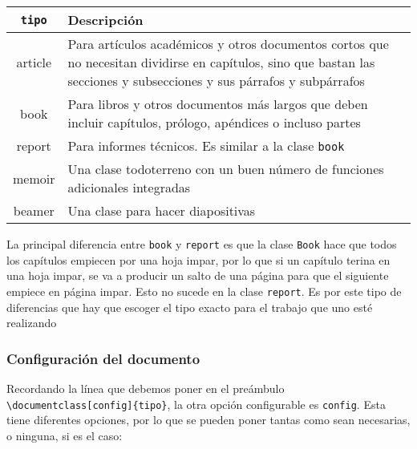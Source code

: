 	\begin{center}
		\begin{tabularx}{\textwidth}{|c|X|}
			\hline
			\verb|tipo| & Descripción\\
			\hline			
			article & Para artículos académicos y otros documentos cortos que no necesitan dividirse en capítulos, sino que bastan las secciones y subsecciones y sus párrafos y subpárrafos\\
			\hline
			book & Para libros y otros documentos más largos que deben incluir capítulos, prólogo, apéndices o incluso partes\\
			\hline
			report & Para informes técnicos. Es similar a la clase \verb|book|\\
			\hline
			memoir & Una clase todoterreno con un buen número de funciones adicionales integradas\\
			\hline
			beamer & Una clase para hacer diapositivas\\
			\hline
		\end{tabularx}
	\end{center}
	
	
	La principal diferencia entre \texttt{book} y \texttt{report} es que la clase \texttt{Book} hace que todos los capítulos empiecen por una hoja impar, por lo que si un capítulo terina en una hoja impar, se va a producir un salto de una página para que el siguiente empiece en página impar. Esto no sucede en la clase \texttt{report}. Es por este tipo de diferencias que hay que escoger el tipo exacto para el trabajo que uno esté realizando
	
	\subsubsection{Configuración del documento}
	
	Recordando la línea que debemos poner en el preámbulo \verb|\documentclass[config]{tipo}|, la otra opción configurable es \texttt{config}. Esta tiene diferentes opciones, por lo que se pueden poner tantas como sean necesarias, o ninguna, si es el caso:
	
